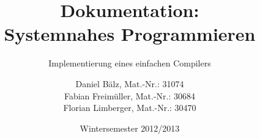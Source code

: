 \documentclass[a4paper,titlepage,12pt]{scrreprt}
\begin{document}
\titlehead{
	\texttt{[image: hska\_logo]}
}

\title{Dokumentation: \\ Systemnahes Programmieren}
\subtitle{Implementierung eines einfachen Compilers}
\author{%
	Daniel Bälz, Mat.-Nr.: 31074 \\
	Fabian Freimüller, Mat.-Nr.: 30684 \\
	Florian Limberger, Mat.-Nr.: 30470
}
\date{Wintersemester 2012/2013}
\publishers{
    \textbf{Betreuer:} Prof.\,Dr. Thomas Fuchß
}
\maketitle

\tableofcontents

\clearpage










\end{document}
